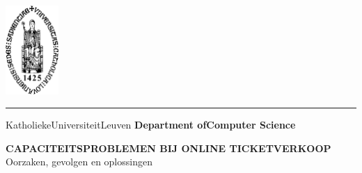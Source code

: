 \documentclass[a4paper,10pt]{article}
\begin{document}

\begin{titlepage}
    \newpage
    \thispagestyle{empty}
    \frenchspacing
    \hspace{-0.2cm}
    \includegraphics[height=3.4cm]{img/kul-logo.png}
    \hspace{0.2cm}
    \rule{0.5pt}{3.4cm}
    \hspace{0.2cm}
    \begin{minipage}[b]{8cm}
        \Large{Katholieke\newline Universiteit\newline Leuven}\smallskip\newline
        \large{}\smallskip\newline
        \textbf{Department of\newline Computer Science}\smallskip
    \end{minipage}
    \vspace*{3.2cm}\vfill
    \begin{center}
        \begin{minipage}[t]{\textwidth}
            \begin{center}
                \LARGE{\rm{\textbf{\uppercase{Capaciteitsproblemen bij online ticketverkoop}}}}\\
                \Large{\rm{Oorzaken, gevolgen en oplossingen}}
            \end{center}
        \end{minipage}
    \end{center}
    \vfill
    \hfill{}
\end{titlepage}

\tableofcontents
\newpage

% 




\end{document}
